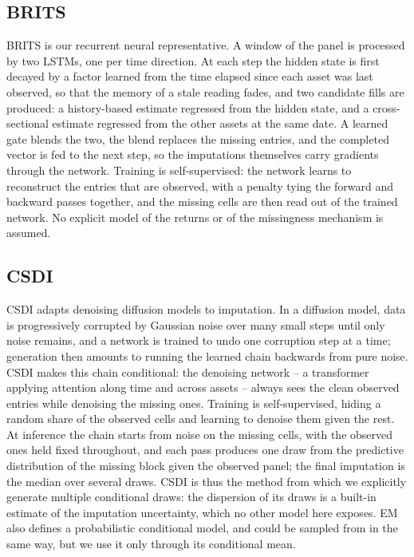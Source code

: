 \subsection{BRITS}

BRITS \citep{cao2018} is our recurrent neural representative. A window of
the panel is processed by two LSTMs, one per time direction. At each step
the hidden state is first decayed by a factor learned from the time elapsed
since each asset was last observed, so that the memory of a stale reading
fades, and two candidate fills are produced: a history-based estimate
regressed from the hidden state, and a cross-sectional estimate regressed
from the other assets at the same date. A learned gate blends the two, the
blend replaces the missing entries, and the completed vector is fed to the
next step, so the imputations themselves carry gradients through the
network. Training is self-supervised: the network learns to reconstruct the
entries that are observed, with a penalty tying the forward and backward
passes together, and the missing cells are then read out of the trained
network. No explicit model of the returns or of the missingness mechanism
is assumed.

\subsection{CSDI}

CSDI \citep{tashiro2021} adapts denoising diffusion models \citep{ho2020} to
imputation. In a diffusion model, data is progressively corrupted by
Gaussian noise over many small steps until only noise remains, and a network
is trained to undo one corruption step at a time; generation then amounts to
running the learned chain backwards from pure noise. CSDI makes this chain
conditional: the denoising network -- a transformer applying attention along
time and across assets \citep{vaswani2017} -- always sees the clean observed
entries while denoising the missing ones. Training is self-supervised,
hiding a random share of the observed cells and learning to denoise them
given the rest. At inference the chain starts from noise on the missing
cells, with the observed ones held fixed throughout, and each pass produces
one draw from the predictive distribution of the missing block given the
observed panel; the final imputation is the median over several draws. CSDI
is thus the method from which we explicitly generate multiple conditional draws:
the dispersion of its draws is a built-in estimate of the imputation uncertainty,
which no other model here exposes. EM also defines a probabilistic conditional
model, and could be sampled from in the same way, but we use it only through its
conditional mean.



